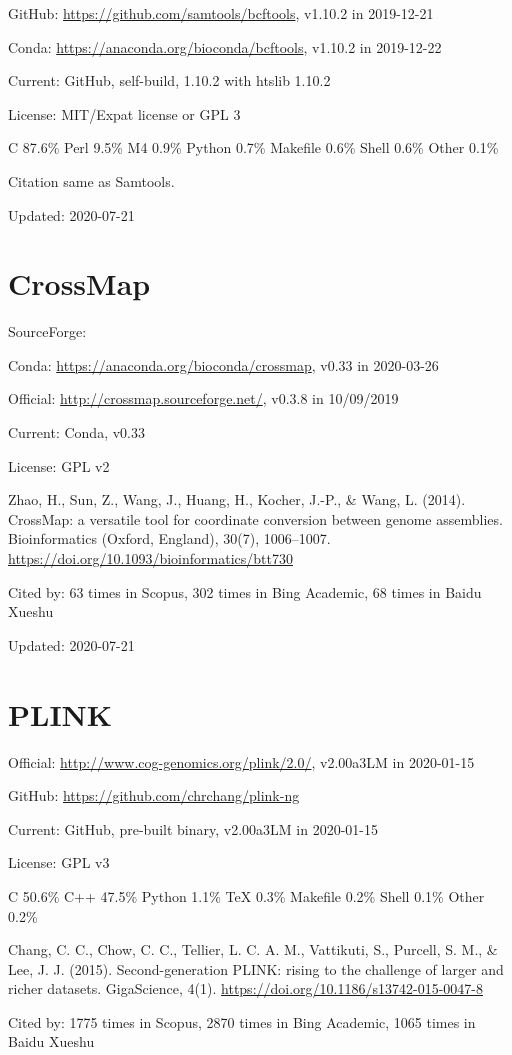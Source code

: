 \documentclass[]{article}
\newcommand{\cb}[3]{\par Cited by: {\color{blue}\Huge #1} times in Scopus, {\color{blue}\Huge #2} times in Bing Academic, {\color{blue}\Huge #3} times in Baidu Xueshu}
\begin{document}
GitHub: \url{https://github.com/samtools/bcftools}, v1.10.2 in 2019-12-21

Conda: \url{https://anaconda.org/bioconda/bcftools}, v1.10.2 in 2019-12-22

Current: GitHub, self-build, 1.10.2 with htslib 1.10.2

License: MIT/Expat license or GPL 3

C 87.6\% Perl 9.5\% M4 0.9\% Python 0.7\% Makefile 0.6\% Shell 0.6\% Other 0.1\%

Citation same as Samtools.

Updated: 2020-07-21

\section{CrossMap}

SourceForge: 

Conda: \url{https://anaconda.org/bioconda/crossmap}, v0.33 in 2020-03-26

Official: \url{http://crossmap.sourceforge.net/}, v0.3.8 in 10/09/2019

Current: Conda, v0.33

License: GPL v2

Zhao, H., Sun, Z., Wang, J., Huang, H., Kocher, J.-P., \& Wang, L. (2014). CrossMap: a versatile tool for coordinate conversion between genome assemblies. Bioinformatics (Oxford, England), 30(7), 1006–1007. \url{https://doi.org/10.1093/bioinformatics/btt730}\cb{63}{302}{68}

Updated: 2020-07-21

\section{PLINK}

Official: \url{http://www.cog-genomics.org/plink/2.0/}, v2.00a3LM in 2020-01-15

GitHub: \url{https://github.com/chrchang/plink-ng}

Current: GitHub, pre-built binary, v2.00a3LM in 2020-01-15

License: GPL v3

C 50.6\% C++ 47.5\% Python 1.1\% TeX 0.3\% Makefile 0.2\% Shell 0.1\% Other 0.2\% 

Chang, C. C., Chow, C. C., Tellier, L. C. A. M., Vattikuti, S., Purcell, S. M., \& Lee, J. J. (2015). Second-generation PLINK: rising to the challenge of larger and richer datasets. GigaScience, 4(1). \url{https://doi.org/10.1186/s13742-015-0047-8}\cb{1775}{2870}{1065}
\end{document}
